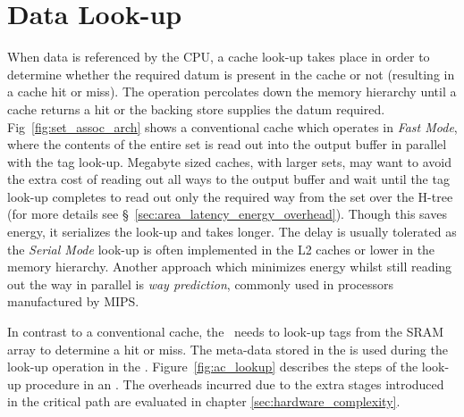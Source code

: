 \section{Data Look-up}

When data is referenced by the CPU, a cache look-up takes place in order to determine whether the required datum is present in the cache or not (resulting in a cache hit or miss). The operation percolates down the memory hierarchy until a cache returns a hit or the backing store supplies the datum required. Fig~\ref{fig:set_assoc_arch} shows a conventional cache which operates in \textit{Fast Mode}, where the contents of the entire set is read out into the output buffer in parallel with the tag look-up. Megabyte sized caches, with larger sets, may want to avoid the extra cost of reading out all ways to the output buffer and wait until the tag look-up completes to read out only the required way from the set over the H-tree (for more details see \S~\ref{sec:area_latency_energy_overhead}). Though this saves energy, it serializes the look-up and takes longer. The delay is usually tolerated as the \textit{Serial Mode} look-up is often implemented in the L2 caches or lower in the memory hierarchy. Another approach which minimizes energy whilst still reading out the way in parallel is \textit{way prediction}\cite{patent:DataCacheWayPrediction,patent:WayPredictionVirtualHint}, commonly used in processors manufactured by MIPS.

In contrast to a conventional cache, the \AC\ needs to look-up tags from the SRAM array to determine a hit or miss. The meta-data stored in the  is used during the look-up operation in the \AC{}. Figure~\ref{fig:ac_lookup} describes the steps of the look-up procedure in an \AC{}. The overheads incurred due to the extra stages introduced in the critical path are evaluated in chapter \ref{sec:hardware_complexity}.

